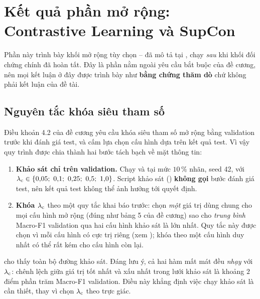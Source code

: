 \section{Kết quả phần mở rộng: Contrastive Learning và SupCon}
\label{sec:results-ext}

Phần này trình bày khối mở rộng tùy chọn -- đã mô tả tại
, chạy \emph{sau} khi khối đối chứng chính đã hoàn tất. Đây là phần
nằm ngoài yêu cầu bắt buộc của đề cương, nên mọi kết luận ở đây được trình bày như
\textbf{bằng chứng thăm dò} chứ không phải kết luận của đề tài.

\subsection{Nguyên tắc khóa siêu tham số}
\label{sec:results-ext-lambda}

Điều khoản 4.2 của đề cương yêu cầu khóa siêu tham số mở rộng bằng validation trước khi đánh
giá test, và cấm lựa chọn cấu hình dựa trên kết quả test. Vì vậy quy trình được chia thành hai
bước tách bạch về mặt thông tin:

\begin{enumerate}[label=\textbf{B\arabic*.},leftmargin=1.4cm,itemsep=3pt]
  \item \textbf{Khảo sát chỉ trên validation.} Chạy  và  tại mức
        $10\,\%$ nhãn, seed 42, với $\lamc \in \{0{,}05;\ 0{,}1;\ 0{,}25;\ 0{,}5;\ 1{,}0\}$.
        Script khảo sát () \textbf{không gọi} bước đánh giá
        test, nên kết quả test không thể ảnh hưởng tới quyết định.
  \item \textbf{Khóa $\lambda_{\mathrm{c}}$} theo một quy tắc khai báo trước: chọn \emph{một} giá trị dùng
        chung cho mọi cấu hình mở rộng (đúng như bảng 5 của đề cương) sao cho \emph{trung bình}
        Macro-F1 validation qua hai cấu hình khảo sát là lớn nhất. Quy tắc này được chọn vì mỗi
        cấu hình có cực trị riêng (xem ); khóa theo một cấu hình duy
        nhất có thể rất kém cho cấu hình còn lại.
\end{enumerate}



 cho thấy toàn bộ đường khảo sát. Đáng lưu ý, cả hai hàm mất mát đều
\emph{nhạy} với $\lambda_{\mathrm{c}}$: chênh lệch giữa giá trị tốt nhất và xấu nhất trong lưới khảo sát là
khoảng $2$ điểm phần trăm Macro-F1 validation. Điều này khẳng định việc chạy khảo sát là cần
thiết, thay vì chọn $\lambda_{\mathrm{c}}$ theo trực giác.

